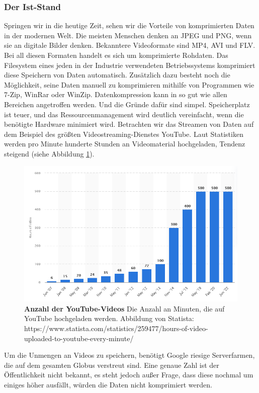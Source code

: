 \subsubsection*{Der Ist-Stand}
Springen wir in die heutige Zeit, sehen wir die Vorteile von komprimierten Daten in der modernen Welt.
Die meisten Menschen denken an JPEG und PNG, wenn sie an digitale Bilder denken.
Bekanntere Videoformate sind MP4, AVI und FLV.
Bei all diesen Formaten handelt es sich um komprimierte Rohdaten.
Das Filesystem eines jeden in der Industrie verwendeten Betriebssystems komprimiert diese Speichern von Daten automatisch.
Zusätzlich dazu besteht noch die Möglichkeit, seine Daten manuell zu komprimieren mithilfe von Programmen wie 7-Zip, WinRar oder WinZip.
Datenkompression kann in so gut wie allen Bereichen angetroffen werden.
Und die Gründe dafür sind simpel.
Speicherplatz ist teuer, und das Ressourcenmanagement wird deutlich vereinfacht, wenn die benötigte Hardware minimiert wird.
Betrachten wir das Streamen von Daten auf dem Beispiel des größten Videostreaming-Dienstes YouTube.
Laut Statistiken werden pro Minute hunderte Stunden an Videomaterial hochgeladen, Tendenz steigend (siehe Abbildung \ref{fig:youtube}).
\begin{figure}[htb]
  \centering  
  \includegraphics[scale=0.8]{Bilder/youtube_statistik.png}
  \caption[YouTube Statistik]{\textbf{Anzahl der YouTube-Videos} Die Anzahl an Minuten, die auf YouTube hochgeladen werden.
  Abbildung von Statista: https://www.statista.com/statistics/259477/hours-of-video-uploaded-to-youtube-every-minute/ }
  \label{fig:youtube}
\end{figure}
Um die Unmengen an Videos zu speichern, benötigt Google riesige Serverfarmen, die auf dem gesamten Globus verstreut sind.
Eine genaue Zahl ist der Öffentlichkeit nicht bekannt, es steht jedoch außer Frage, dass diese nochmal um einiges höher ausfällt, würden die Daten nicht komprimiert werden. \newline

